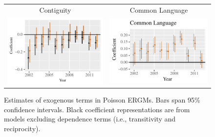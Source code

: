 \documentclass{article}
\begin{document}
\begin{figure}
\begin{tabular}{c@{\hskip -.4cm}c}
Contiguity &
Common Language\\
\includegraphics[height=.22\textheight, clip=true, trim=0cm .5cm 0cm .1cm]{draft_figures/rl_plots/Contiguity.pdf}  &
\includegraphics[height=.22\textheight, clip=true, trim=.5cm .5cm 0cm .1cm]{draft_figures/rl_plots/CommonLanguage.pdf}   \\
\end{tabular}
\caption{\label{fig:effectPlots1} Estimates of exogenous terms in Poisson ERGMs. Bars span 95\% confidence intervals. Black coefficient representations are from models excluding dependence terms (i.e., transitivity and reciprocity).}
\end{figure}
\end{document}
